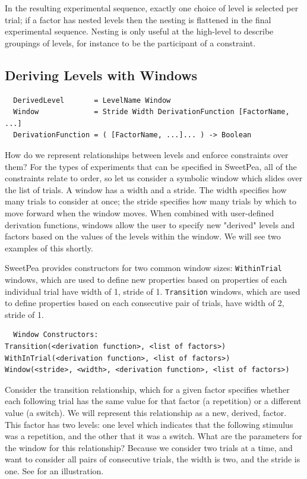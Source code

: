 In the resulting experimental sequence, exactly one choice of level is selected per trial; if a factor has nested levels then the nesting is flattened in the final experimental sequence. Nesting is only useful at the high-level to describe groupings of levels, for instance to be the participant of a constraint.



\subsection{Deriving Levels with Windows}

\begin{verbatim}
  DerivedLevel       = LevelName Window
  Window             = Stride Width DerivationFunction [FactorName, ...]
  DerivationFunction = ( [FactorName, ...]... ) -> Boolean
\end{verbatim}

How do we represent relationships between levels and enforce constraints over them? For the types of experiments that can be specified in SweetPea, all of the constraints relate to order, so let us consider a symbolic window which slides over the list of trials. A window has a width and a stride. The width specifies how many trials to consider at once; the stride specifies how many trials by which to move forward when the window moves. When combined with user-defined derivation functions, windows allow the user to specify new "derived" levels and factors based on the values of the levels within the window. We will see two examples of this shortly.

SweetPea provides constructors for two common window sizes: \texttt{WithinTrial} windows, which are used to define new properties based on properties of each individual trial have width of 1, stride of 1. \texttt{Transition} windows, which are used to define properties based on each consecutive pair of trials, have width of 2, stride of 1.

\begin{verbatim}
  Window Constructors:
Transition(<derivation function>, <list of factors>)
WithInTrial(<derivation function>, <list of factors>)
Window(<stride>, <width>, <derivation function>, <list of factors>)
\end{verbatim}

Consider the transition relationship, which for a given factor specifies whether each following trial has the same value for that factor (a repetition) or a different value (a switch). We will represent this relationship as a new, derived, factor. This factor has two levels: one level which indicates that the following stimulus was a repetition, and the other that it was a switch. What are the parameters for the window for this relationship? Because we consider two trials at a time, and want to consider all pairs of consecutive trials, the width is two, and the stride is one. See  for an illustration.

